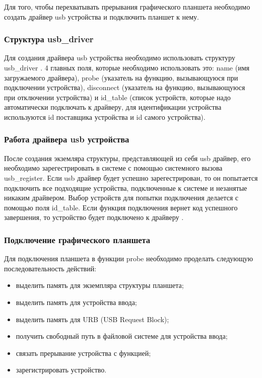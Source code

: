 Для того, чтобы перехватывать прерывания графического планшета необходимо создать драйвер usb устройства и подключить планшет к нему.

\subsubsection{Структура usb\_driver}

Для создания драйвера usb устройства необходимо использовать структуру usb\_driver \cite{Usb_driver}. 4 главных поля, которые необходимо использовать это: name (имя загружаемого драйвера), probe (указатель на функцию, вызывающуюся при подключении устройства), disconnect (указатель на функцию, вызывающуюся при отключении устройства) и id\_table (список устройств, которые надо автоматически подключать к драйверу, для идентификации устройства используются id поставщика устройства и id самого устройства).

\subsubsection{Работа драйвера usb устройства}

После создания экземляра структуры, представляющей из себя usb драйвер, его необходимо зарегестрировать в системе с помощью системного вызова usb\_register. Если usb драйвер будет успешно зарегестрирован, то он попытается подключить все подходящие устройства, подключенные к системе и незанятые никаким драйвером. Выбор устройств для попытки подключения делается с помощью поля id\_table. Если функция подключения вернет код успешного завершения, то устройство будет подключено к драйверу \cite{Usb_driver}.

\subsubsection{Подключение графического планшета}

Для подключения планшета в функции probe необходимо проделать следующую последовательность действий:

\begin{itemize}
    \item выделить память для экземпляра структуры планшета;
    \item выделить память для устройства ввода;
    \item выделить память для URB (USB Request Block);
    \item получить свободный путь в файловой системе для устройства ввода;
    \item связать прерывание устройства с функцией;
    \item зарегистрировать устройство.
\end{itemize}

